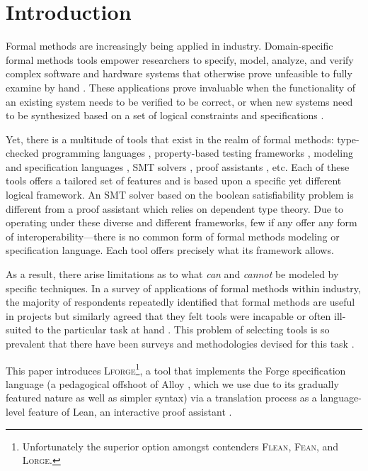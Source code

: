 
\section{Introduction}
Formal methods are increasingly being applied in industry. Domain-specific formal methods tools empower researchers to specify, model, analyze, and verify complex software and hardware systems that otherwise prove unfeasible to fully examine by hand \cite{abrial2006formal,lecomte2017applying}. These applications prove invaluable when the functionality of an existing system needs to be verified to be correct, or when new systems need to be synthesized based on a set of logical constraints and specifications \cite{woodcock2009formal}.

Yet, there is a multitude of tools that exist in the realm of formal methods: type-checked programming languages \cite{gao2017type,chaudhuri2017fast}, property-based testing frameworks \cite{fink1997property,maciver2019hypothesis}, modeling and specification languages \cite{jackson2012software,jackson2019alloy,ngpdbccdlrrvwwk-oopsla-2024}, SMT solvers \cite{de2008z3}, proof assistants \cite{moura2021lean}, etc. Each of these tools offers a tailored set of features and is based upon a specific yet different logical framework. An SMT solver based on the boolean satisfiability problem is different from a proof assistant which relies on dependent type theory. Due to operating under these diverse and different frameworks, few if any offer any form of interoperability---there is no common form of formal methods modeling or specification language. Each tool offers precisely what its framework allows. 

As a result, there arise limitations as to what \emph{can} and \emph{cannot} be modeled by specific techniques. In a survey of applications of formal methods within industry, the majority of respondents repeatedly identified that formal methods are useful in projects but similarly agreed that they felt tools were incapable or often ill-suited to the particular task at hand \cite{woodcock2009formal}. This problem of selecting tools is so prevalent that there have been surveys and methodologies devised for this task \cite{kossak2016select,cheng2006survey}. 

This paper introduces \textsc{Lforge}\footnote{Unfortunately the superior option amongst contenders \textsc{Flean}, \textsc{Fean}, and \textsc{Lorge}.}, a tool that implements the Forge specification language \cite{ngpdbccdlrrvwwk-oopsla-2024} (a pedagogical offshoot of Alloy \cite{jackson2012software}, which we use due to its gradually featured nature as well as simpler syntax) via a translation process as a language-level feature of Lean, an interactive proof assistant \cite{moura2021lean}.

